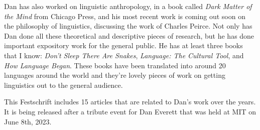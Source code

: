\begin{refsection}
Dan has also worked on linguistic anthropology, in a book called \textit{Dark Matter of the Mind} from Chicago Press, and his most recent work is coming out soon on the philosophy of linguistics, discussing the work of Charles Peirce.  Not only has Dan done all these theoretical and descriptive pieces of research, but he has done important expository work for the general public. He has at least three books that I know: \textit{Don't Sleep There Are Snakes}, \textit{Language: The Cultural Tool}, and \textit{How Language Began}. These books have been translated into around 20 languages around the world and they're lovely pieces of work on getting linguistics out to the general audience. 

This Festschrift includes 15 articles that are related to Dan's work over the years. It is being released after a tribute event for Dan Everett that was held at MIT on June 8th, 2023. 

{\sloppy\printbibliography[heading=subbibliography]}
\end{refsection}

